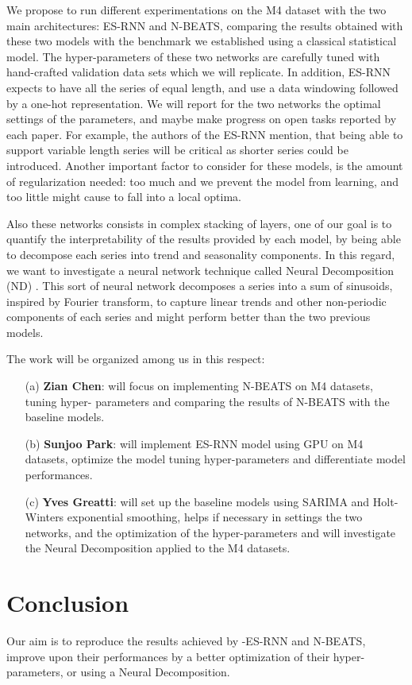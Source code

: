 \documentclass{article}
\begin{document}
We propose to run different experimentations on the M4 dataset with the two main architectures: ES-RNN and N-BEATS, comparing the results obtained with these two models 
with the benchmark we established using a classical statistical model.
The hyper-parameters of these two networks are carefully tuned with hand-crafted validation data sets which we will replicate. 
In addition, ES-RNN expects to have all the series of equal length, and use a data windowing followed by a one-hot representation.
We will report for the two networks the optimal settings of the parameters, and maybe make progress on open tasks reported by each paper.
For example, the authors of the ES-RNN mention, that being able to support variable length series will be critical as shorter series could be introduced.
Another important factor to consider for these models, is the amount of regularization needed: too much and we prevent the model from learning, and too little might cause to fall into a local optima.

Also these networks consists in complex stacking of layers, one of our goal is to quantify the interpretability of the results provided 
by each model, by being able to decompose each series into trend and seasonality components. 
In this regard, we want to investigate a neural network technique called Neural Decomposition (ND) \cite{NeuralDecomposition}. This sort of neural network
decomposes a series into a sum of sinusoids, inspired by Fourier transform, to capture linear trends and other non-periodic components of each series and might perform better than the two previous models.

The work will be organized among us in this respect: 
\begin{itemize}
	\item[(a)] \textbf{Zian Chen}: will focus on implementing N-BEATS on M4 datasets, tuning hyper- parameters and comparing the results of N-BEATS with the baseline models.
	\item[(b)] \textbf{Sunjoo Park}: will implement ES-RNN model using GPU on M4 datasets, optimize the model tuning hyper-parameters and differentiate model performances.
	\item[(c)] \textbf{Yves Greatti}: will set up the baseline models using SARIMA and  Holt-Winters exponential smoothing, helps if necessary in settings the two networks, and the optimization of the hyper-parameters 
	and will investigate the Neural Decomposition applied to the M4 datasets.
\end{itemize}

\section{Conclusion}
Our aim is to reproduce the results achieved by -ES-RNN and N-BEATS, improve upon their performances by a better optimization of their hyper-parameters, or using a Neural Decomposition.
 

\end{document}
